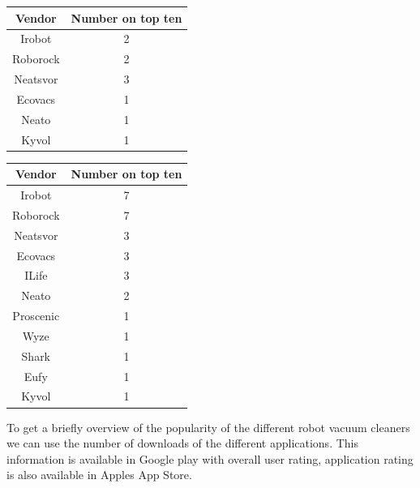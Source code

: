 \begin{table}[]
\begin{tabular}{|c|c|}
\hline
Vendor   & Number on top ten \\ \hline
Irobot   & 2                 \\ \hline
Roborock & 2                 \\ \hline
Neatsvor & 3                 \\ \hline
Ecovacs  & 1                 \\ \hline
Neato    & 1                 \\ \hline
Kyvol    & 1                 \\ \hline
\end{tabular}
\end{table}

\begin{table}[]
\begin{tabular}{|c|c|}
\hline
Vendor    & Number on top ten \\ \hline
Irobot    & 7                 \\ \hline
Roborock  & 7                 \\ \hline
Neatsvor  & 3                 \\ \hline
Ecovacs   & 3                 \\ \hline
ILife     & 3                 \\ \hline
Neato     & 2                 \\ \hline
Proscenic & 1                 \\ \hline
Wyze      & 1                 \\ \hline
Shark     & 1                 \\ \hline
Eufy      & 1                 \\ \hline
Kyvol     & 1                 \\ \hline
\end{tabular}
\end{table}

To get a briefly overview of the popularity of the different robot vacuum cleaners we can use the number of downloads of the different applications. This information is available in Google play with overall user rating, application rating is also available in Apples App Store. 

